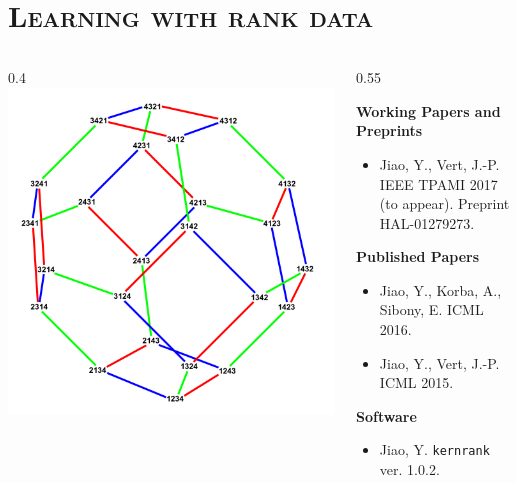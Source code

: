 \documentclass[xcolor=x11names,compress]{beamer}
\theoremstyle{plain}
\renewcommand{\(}{\begin{columns}}
\renewcommand{\)}{\end{columns}}
\newcommand{\<}[1]{\begin{column}{#1}}
\renewcommand{\>}{\end{column}}
\newcommand{\addsectiontitlepage}{
	\hfill\leavevmode
  \vtop{
    \huge\hbox{\color{myblue}\insertsection}
    \kern.5ex %
    \vspace{1cm}
  }
}
\begin{document}
\section{\scshape Learning with rank data}


\begin{frame}
	
	\addsectiontitlepage
	
	\(
	\<{0.4\linewidth}
		\includegraphics[width=\columnwidth]{ch-kendall/figures/permutahedron}
	\>
	
	\<{0.55\linewidth}
	\begin{footnotesize}
	\textbf{Working Papers and Preprints}
	\begin{itemize}
		\item \nocite{Jiao2017Kendall} Jiao, Y., Vert, J.-P. IEEE TPAMI 2017 (to appear). Preprint HAL-01279273.
	\end{itemize}
	
	\textbf{Published Papers}
	\begin{itemize}
		\item \nocite{Jiao2016Controlling} Jiao, Y., Korba, A., Sibony, E. ICML 2016.
		\item \nocite{Jiao2015Kendall} Jiao, Y., Vert, J.-P. ICML 2015.
	\end{itemize}
	
	\textbf{Software}
	\begin{itemize}
		\item \nocite{Jiao2016kernrank} Jiao, Y. \texttt{kernrank} ver. 1.0.2.
	\end{itemize}
	\end{footnotesize}
	\>
	\)
	
\end{frame}
\end{document}
